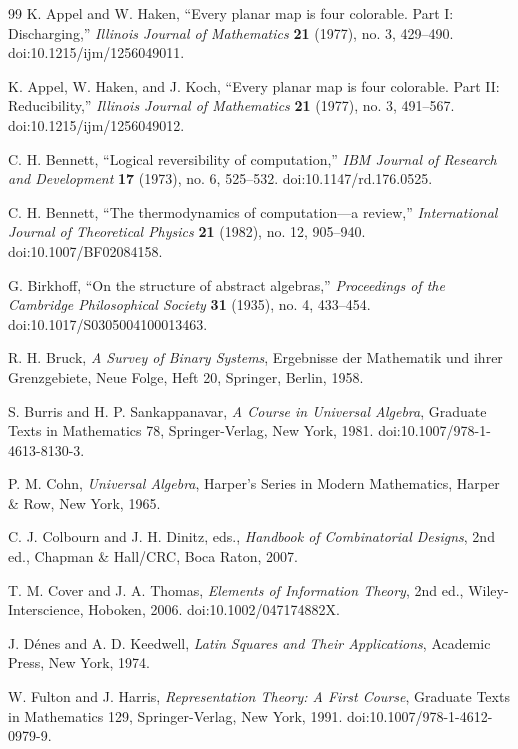 \documentclass[11pt]{article}
\theoremstyle{definition}
\begin{document}
\clearpage
{}
\begin{thebibliography}{99}
 K. Appel and W. Haken, ``Every planar map is four colorable. Part I:
Discharging,'' \emph{Illinois Journal of Mathematics} \textbf{21}
(1977), no. 3, 429--490. doi:10.1215/ijm/1256049011.

 K. Appel, W. Haken, and J. Koch, ``Every planar map is four colorable.
Part II: Reducibility,'' \emph{Illinois Journal of Mathematics}
\textbf{21} (1977), no. 3, 491--567. doi:10.1215/ijm/1256049012.

 C. H. Bennett, ``Logical reversibility of computation,'' \emph{IBM
Journal of Research and Development} \textbf{17} (1973), no. 6,
525--532. doi:10.1147/rd.176.0525.

 C. H. Bennett, ``The thermodynamics of computation---a review,''
\emph{International Journal of Theoretical Physics} \textbf{21} (1982),
no. 12, 905--940. doi:10.1007/BF02084158.

 G. Birkhoff, ``On the structure of abstract algebras,''
\emph{Proceedings of the Cambridge Philosophical Society} \textbf{31}
(1935), no. 4, 433--454. doi:10.1017/S0305004100013463.

 R. H. Bruck, \emph{A Survey of Binary Systems}, Ergebnisse der
Mathematik und ihrer Grenzgebiete, Neue Folge, Heft 20, Springer,
Berlin, 1958.

 S. Burris and H. P. Sankappanavar, \emph{A Course in Universal Algebra},
Graduate Texts in Mathematics 78, Springer-Verlag, New York, 1981.
doi:10.1007/978-1-4613-8130-3.

 P. M. Cohn, \emph{Universal Algebra}, Harper's Series in Modern
Mathematics, Harper \& Row, New York, 1965.

 C. J. Colbourn and J. H. Dinitz, eds., \emph{Handbook of Combinatorial
Designs}, 2nd ed., Chapman \& Hall/CRC, Boca Raton, 2007.

 T. M. Cover and J. A. Thomas, \emph{Elements of Information Theory}, 2nd
ed., Wiley-Interscience, Hoboken, 2006. doi:10.1002/047174882X.

 J. Dénes and A. D. Keedwell, \emph{Latin Squares and Their
Applications}, Academic Press, New York, 1974.

 W. Fulton and J. Harris, \emph{Representation Theory: A First Course},
Graduate Texts in Mathematics 129, Springer-Verlag, New York, 1991.
doi:10.1007/978-1-4612-0979-9.


\end{thebibliography}
\end{document}
